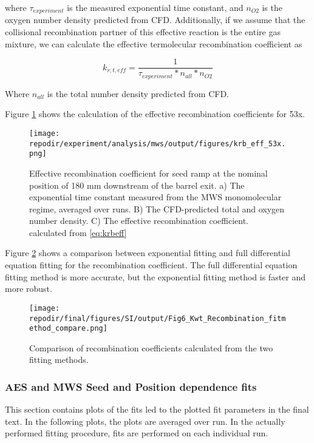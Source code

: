 where $\tau_{experiment}$ is the measured exponential time constant,  and $n_{O2}$ is the oxygen number density predicted from CFD. Additionally, if we assume that the collisional recombination partner of this effective reaction is the entire gas mixture, we can calculate the effective termolecular recombination coefficient as


\begin{equation}
    \label{eq:krteff}
    k_{r,t,eff} = \frac{1}{\tau_{experiment} * n_{all} *  n_{O2}}
\end{equation}

Where $n_{all}$ is the total number density predicted from CFD.

Figure \ref{fig:SI_krb_eff_53x} shows the calculation of the effective recombination coefficients for 53x.

\begin{figure}[]
\centering
\texttt{[image: \\repodir/experiment/analysis/mws/output/figures/krb\_eff\_53x.png]}
\caption{Effective recombination coefficient for seed ramp at the nominal position of 180 mm downstream of the barrel exit. a) The exponential time constant measured from the MWS monomolecular regime, averaged over runs. B) The CFD-predicted total and oxygen number density. C) The effective recombination coefficient. calculated from \ref{eq:krbeff}}
\label{fig:SI_krb_eff_53x}
\end{figure}



Figure \ref{fig:SI_Kwt_Recombination_fitmethod_compare} shows a comparison between exponential fitting and full differential equation fitting for the recombination coefficient. The full differential equation fitting method is more accurate, but the exponential fitting method is faster and more robust.  

\begin{figure}[]
\centering
\texttt{[image: \\repodir/final/figures/SI/output/Fig6\_Kwt\_Recombination\_fitmethod\_compare.png]}
\caption{Comparison of recombination coefficients calculated from the two fitting methods.}
\label{fig:SI_Kwt_Recombination_fitmethod_compare}
\end{figure}


\subsubsection{AES and MWS Seed and Position dependence fits}

This section contains plots of the fits led to the plotted fit parameters in the final text. In the following plots, the plots are averaged over run. In the actually performed fitting procedure, fits are performed on each individual run. 

